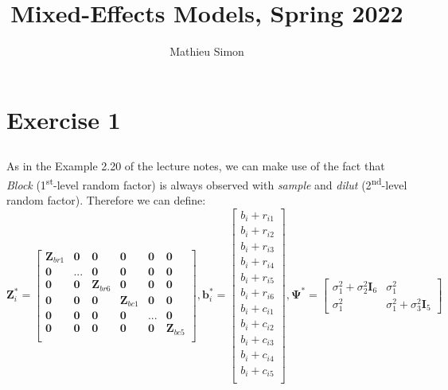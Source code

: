 \documentclass[a4paper,12pt]{article}
\begin{document}
	
	\title{Mixed-Effects Models, Spring 2022}
	\author{Mathieu Simon}
	\maketitle
	
	\setlength{\parskip}{1em}
	
	\section{Exercise 1}
	
	\subsection{}
	
	As in the Example 2.20 of the lecture notes, we can make use of the fact that \textit{Block} (1\textsuperscript{st}-level random factor) is always observed with \textit{sample} and \textit{dilut} (2\textsuperscript{nd}-level random factor). Therefore we can define:\\
	
	$ \mathbf{Z}_i^* = 
	\begin{bmatrix}
		\mathbf{Z}_{br1} & \mathbf{0} & \mathbf{0} & \mathbf{0} & \mathbf{0} & \mathbf{0} \\
		\mathbf{0} & ... & \mathbf{0} & \mathbf{0} & \mathbf{0} & \mathbf{0}\\
		\mathbf{0} & \mathbf{0} & \mathbf{Z}_{br6} & \mathbf{0} & \mathbf{0} & \mathbf{0} \\
		\mathbf{0} & \mathbf{0} & \mathbf{0} & \mathbf{Z}_{bc1} & \mathbf{0} & \mathbf{0} \\
		\mathbf{0} & \mathbf{0} & \mathbf{0} & \mathbf{0} & ... & \mathbf{0} \\
		\mathbf{0} & \mathbf{0} & \mathbf{0} & \mathbf{0} & \mathbf{0} & \mathbf{Z}_{bc5} \\
	\end{bmatrix}, 
	\mathbf{b}_i^* =
	\begin{bmatrix}
		b_i + r_{i1} \\
		b_i + r_{i2} \\
		b_i + r_{i3} \\
		b_i + r_{i4} \\
		b_i + r_{i5} \\
		b_i + r_{i6} \\
		b_i + c_{i1} \\
		b_i + c_{i2} \\
		b_i + c_{i3} \\
		b_i + c_{i4} \\
		b_i + c_{i5} \\
	\end{bmatrix}, 
	\mathbf{\Psi}^* = 
	\begin{bmatrix}
		\sigma_1^2 + \sigma_2^2 \mathbf{I}_6 & \sigma_1^2 \\
		\sigma_1^2 & \sigma_1^2 + \sigma_3^2 \mathbf{I}_5
	\end{bmatrix}$
	
\end{document}
